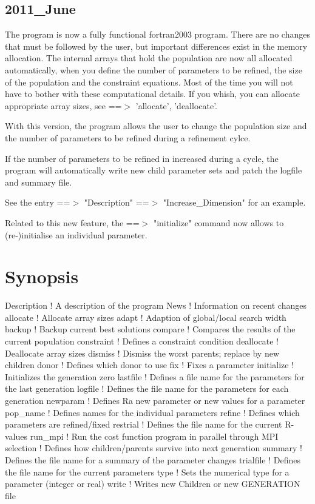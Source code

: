 \subsection*{2011\_June}
\par
The program is now a fully functional fortran2003 program. 
There are no changes that must be followed by the user, but important 
differences exist in the memory allocation. The internal arrays that hold 
the population are now all allocated automatically, when you define the 
number of parameters to be refined, the size of the population and the 
constraint equations. Most of the time you will not have to bother with 
these computational details. If you whish, you can allocate appropriate 
array sizes, see ==$> $ 'allocate', 'deallocate'. 
\par
With this version, the program allows the user to change the population 
size and the number of parameters to be refined during a refinement cylce. 
\par
If the number of parameters to be refined in increased during a cycle, 
the program will automatically write new child parameter sets and patch 
the logfile and summary file. 
\par
See the entry ==$> $ "Description" ==$> $ "Increase\_Dimension" for an example. 
\par
Related to this new feature, the ==$> $ "initialize" command now allows to 
(re-)initialise an individual parameter. 
\par
\section{Synopsis}
\par
\begin{MacVerbatim}
Description ! A description of the program
News        ! Information on recent changes
allocate    ! Allocate array sizes
adapt       ! Adaption of global/local search width
backup      ! Backup current best solutions
compare     ! Compares the results of the current population
constraint  ! Defines a constraint condition
deallocate  ! Deallocate array sizes
dismiss     ! Dismiss the worst parents; replace by new children
donor       ! Defines which donor to use
fix         ! Fixes a parameter
initialize  ! Initializes the generation zero
lastfile    ! Defines a file name for the parameters for the last generation
logfile     ! Defines the file name for the parameters for each generation
newparam    ! Defines Ra new parameter or new values for a parameter
pop_name    ! Defines names for the individual parameters
refine      ! Defines which parameters are refined/fixed
restrial    ! Defines the file name for the current R-values
run_mpi     ! Run the cost function program in parallel through MPI
selection   ! Defines how children/parents survive into next generation
summary     ! Defines the file name for a summary of the parameter changes
trialfile   ! Defines the file name for the current parameters
type        ! Sets the numerical type for a parameter (integer or real)
write       ! Writes new Children or new GENERATION file
\end{MacVerbatim}
